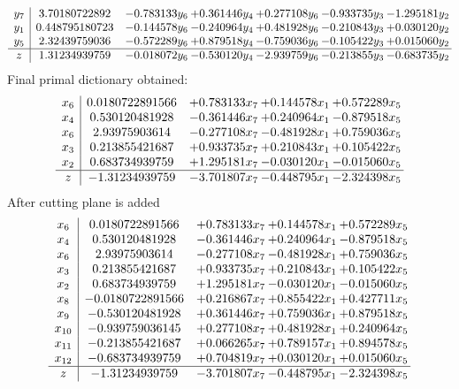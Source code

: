 \documentclass[11pt]{article}
\begin{document}
\[\begin{array}{c| c c@{\hskip 2pt} c@{\hskip 2pt} c@{\hskip 2pt} c@{\hskip 2pt} c@{\hskip 2pt} }
 y_{7}   &  3.70180722892 & -0.783133 y_{6} & + 0.361446 y_{4} & + 0.277108 y_{6} & -0.933735 y_{3} & -1.295181 y_{2}\\
 y_{1}   &  0.448795180723 & -0.144578 y_{6} & -0.240964 y_{4} & + 0.481928 y_{6} & -0.210843 y_{3} & + 0.030120 y_{2}\\
 y_{5}   &  2.32439759036 & -0.572289 y_{6} & + 0.879518 y_{4} & -0.759036 y_{6} & -0.105422 y_{3} & + 0.015060 y_{2}\\
\hline
z    &  1.31234939759 & -0.018072 y_{6} & -0.530120 y_{4} & -2.939759 y_{6} & -0.213855 y_{3} & -0.683735 y_{2}\\
\end{array}\]
 Final primal dictionary obtained: 
\[\begin{array}{c| c c@{\hskip 2pt} c@{\hskip 2pt} c@{\hskip 2pt} }
 x_{6}   &  0.0180722891566 & + 0.783133 x_{7} & + 0.144578 x_{1} & + 0.572289 x_{5}\\
 x_{4}   &  0.530120481928 & -0.361446 x_{7} & + 0.240964 x_{1} & -0.879518 x_{5}\\
 x_{6}   &  2.93975903614 & -0.277108 x_{7} & -0.481928 x_{1} & + 0.759036 x_{5}\\
 x_{3}   &  0.213855421687 & + 0.933735 x_{7} & + 0.210843 x_{1} & + 0.105422 x_{5}\\
 x_{2}   &  0.683734939759 & + 1.295181 x_{7} & -0.030120 x_{1} & -0.015060 x_{5}\\
\hline
z    &  -1.31234939759 & -3.701807 x_{7} & -0.448795 x_{1} & -2.324398 x_{5}\\
\end{array}\]
 After cutting plane is added 
\[\begin{array}{c| c c@{\hskip 2pt} c@{\hskip 2pt} c@{\hskip 2pt} }
 x_{6}   &  0.0180722891566 & + 0.783133 x_{7} & + 0.144578 x_{1} & + 0.572289 x_{5}\\
 x_{4}   &  0.530120481928 & -0.361446 x_{7} & + 0.240964 x_{1} & -0.879518 x_{5}\\
 x_{6}   &  2.93975903614 & -0.277108 x_{7} & -0.481928 x_{1} & + 0.759036 x_{5}\\
 x_{3}   &  0.213855421687 & + 0.933735 x_{7} & + 0.210843 x_{1} & + 0.105422 x_{5}\\
 x_{2}   &  0.683734939759 & + 1.295181 x_{7} & -0.030120 x_{1} & -0.015060 x_{5}\\
 x_{8}   &  -0.0180722891566 & + 0.216867 x_{7} & + 0.855422 x_{1} & + 0.427711 x_{5}\\
 x_{9}   &  -0.530120481928 & + 0.361446 x_{7} & + 0.759036 x_{1} & + 0.879518 x_{5}\\
 x_{10}   &  -0.939759036145 & + 0.277108 x_{7} & + 0.481928 x_{1} & + 0.240964 x_{5}\\
 x_{11}   &  -0.213855421687 & + 0.066265 x_{7} & + 0.789157 x_{1} & + 0.894578 x_{5}\\
 x_{12}   &  -0.683734939759 & + 0.704819 x_{7} & + 0.030120 x_{1} & + 0.015060 x_{5}\\
\hline
z    &  -1.31234939759 & -3.701807 x_{7} & -0.448795 x_{1} & -2.324398 x_{5}\\
\end{array}\]
\end{document}
